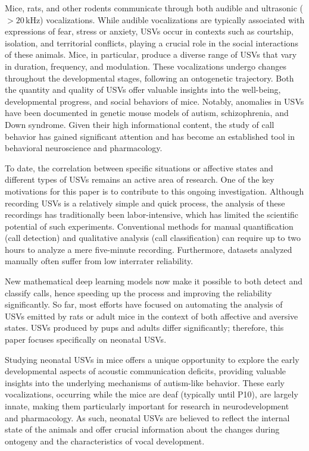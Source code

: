 \documentclass[preprint,NumberedRefs]{JASA}
\begin{document}
Mice, rats, and other rodents communicate through both audible and ultrasonic ($> 20\,\mathrm{kHz}$) vocalizations. While audible vocalizations are typically associated with expressions of fear, stress or anxiety, USVs occur in contexts such as courtship, isolation, and territorial conflicts, playing a crucial role in the social interactions of these animals. \cite{Yao2023-ga} Mice, in particular, produce a diverse range of USVs that vary in duration, frequency, and modulation. These vocalizations undergo changes throughout the developmental stages, following an ontogenetic trajectory. \cite{Elwood1982-vo} Both the quantity and quality of USVs offer valuable insights into the well-being, developmental progress, and social behaviors of mice. \cite{Portfors2007-kn, Peleh2019-ic, Scattoni2008-vp} Notably, anomalies in USVs have been documented in genetic mouse models of autism, schizophrenia, and Down syndrome. \cite{Ey2013-sm, Scattoni2009-zx, Holtzman1996-vf} Given their high informational content, the study of call behavior has gained significant attention and has become an established tool in behavioral neuroscience and pharmacology. \cite{Dirks2002-hy} 

To date, the correlation between specific situations or affective states and different types of USVs remains an active area of research. One of the key motivations for this paper is to contribute to this ongoing investigation. Although recording USVs is a relatively simple and quick process, the analysis of these recordings has traditionally been labor-intensive, which has limited the scientific potential of such experiments. Conventional methods for manual quantification (call detection) and qualitative analysis (call classification) can require up to two hours to analyze a mere five-minute recording. Furthermore, datasets analyzed manually often suffer from low interrater reliability.

New mathematical deep learning models now make it possible to both detect and classify calls, hence speeding up the process and improving the reliability significantly. So far, most efforts have focused on automating the analysis of USVs emitted by rats or adult mice in the context of both affective and aversive states. \cite{Coffey2019-ve,Pessoa2022-sy} USVs produced by pups and adults differ significantly; therefore, this paper focuses specifically on neonatal USVs.

Studying neonatal USVs in mice offers a unique opportunity to explore the early developmental aspects of acoustic communication deficits, providing valuable insights into the underlying mechanisms of autism-like behavior. \cite{Takumi2020-nc} These early vocalizations, occurring while the mice are deaf (typically until P10), are largely innate, making them particularly important for research in neurodevelopment and pharmacology. As such, neonatal USVs are believed to reflect the internal state of the animals and offer crucial information about the changes during ontogeny and the characteristics of vocal development. \cite{Ehret2005-ns}
\end{document}
